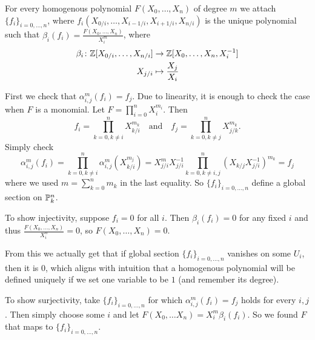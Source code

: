 \begin{exercise}{2}
    For every homogenous polynomial $F(X_0, \dots, X_n)$ of degree $m$ we attach
    $\{f_i\}_{i=0,\dots,n}$, where $f_i(X_{0/i}, \dots, X_{i-1/i}, X_{i+1/i},
    X_{n/i})$ is the unique polynomial such that $\beta_i(f_i) = \frac{F(X_0,
    \dots, X_n)}{X^m_i}$, where
    \begin{align*}
        \beta_i \colon \mathbb{Z}[X_{0/i}, \dots, X_{n/i}] &\to \mathbb{Z}[X_0, \dots, X_n,
        X^{-1}_i] \\
        X_{j/i} &\mapsto \frac{X_j}{X_i}
    \end{align*}
    
    First we check that $\alpha^m_{i, j} (f_i) = f_j$. Due to linearity, it is
    enough to check the case when $F$ is a monomial. Let $F = \prod^n_{i = 0}
    X^{m_i}_i$. Then
    \begin{equation*}
        f_i = \prod^n_{k = 0, k \not= i} X^{m_k}_{k/i} \quad\text{and}\quad f_j
        = \prod^n_{k = 0, k \not= j} X^{m_k}_{j/k}.
    \end{equation*}
    Simply check
    \begin{equation*}
        \alpha^m_{i, j} (f_i) =
        \prod^n_{k = 0, k \not= i} \alpha^m_{i, j} (X^{m_j}_{k/i}) =
        X^m_{j/i} X^{-1}_{j/i} \prod^n_{k = 0, k \not= i, j} (X_{k/j}
        X^{-1}_{j/i})^{m_k} = f_j
    \end{equation*}
    where we used $m = \sum^n_{k=0} m_k$ in the last equality.
    So $\{f_i\}_{i = 0, \dots, n}$ define a global section on $\mathbb{P}^n_k$.

    To show injectivity, suppose $f_i = 0$ for all $i$. Then $\beta_i(f_i) = 0$
    for any fixed $i$ and thus $\frac{F(X_0, \dots, X_n)}{X^n_i} = 0$, so
    $F(X_0, \dots, X_n) = 0$.

    From this we actually get that if global section $\{f_i\}_{i = 0, \dots, n}$
    vanishes on some $U_i$, then it is $0$, which aligns with intuition that a
    homogenous polynomial will be defined uniquely if we set one variable to be
    $1$ (and remember its degree).

    To show surjectivity, take $\{f_i\}_{i = 0, \dots, n}$ for which
    $\alpha^m_{i, j} (f_i) = f_j$ holds for every $i, j$. Then simply choose
    some $i$ and let $F(X_0, \dots X_n) = X^m_i \beta_i(f_i)$. So we found $F$
    that maps to $\{f_i\}_{i = 0, \dots, n}$.
\end{exercise}

